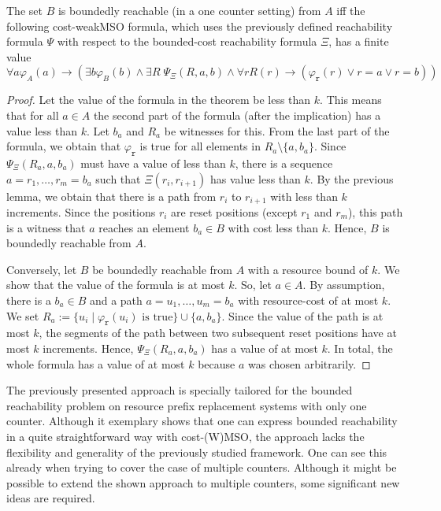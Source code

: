 \documentclass{LMCS}
\newcommand{\rOp}{\ensuremath{\mathtt{r}}}
\begin{document}
\begin{thm}\label{thm:WMSOBoundedReachability}
  The set $B$ is boundedly reachable (in a one counter setting) from $A$ iff the following cost-weakMSO
formula, which uses the previously defined reachability formula $\Psi$ with 
respect to the bounded-cost reachability formula $\Xi$, has a finite value
  $$ \forall a \varphi_A(a) \rightarrow (\exists b \varphi_B(b) \wedge \exists
R\; \Psi_{\Xi}(R,a,b) \wedge \forall r R(r) \rightarrow (\varphi_\rOp(r) \vee r
= a \vee r = b))$$
\end{thm}

\begin{proof}
Let the value of the formula in the theorem be less than $k$. This means that
for all $a \in A$ the second part of the formula (after the implication) has a
value less than $k$. Let $b_a$ and $R_a$ be witnesses for this. From the last
part of the formula, we obtain that $\varphi_\rOp$ is true for all elements in
$R_a \setminus \{a,b_a\}$. Since $\Psi_\Xi(R_a,a,b_a)$ must have a value of less
than $k$, there is a sequence $a = r_1,\ldots,r_m = b_a$ such that
$\Xi(r_i,r_{i+1})$ has value less than $k$. By the previous lemma, we obtain
that there is a path from $r_i$ to $r_{i+1}$ with less than $k$ increments.
Since the positions $r_i$ are reset positions (except $r_1$ and $r_m$), this
path is a witness that $a$ reaches an element $b_a \in B$ with cost less than
$k$. Hence, $B$ is boundedly reachable from $A$.
  
Conversely, let $B$ be boundedly reachable from $A$ with a resource bound of
$k$. We show that the value of the formula is at most $k$. So, let $a \in A$. By
assumption, there is a $b_a \in B$ and a path $a = u_1, \ldots, u_m = b_a$ with
resource-cost of at most $k$. We set $R_a := \{ u_i \mid \varphi_\rOp(u_i)
\text{ is true}\} \cup \{a,b_a\}$. Since the value of the path is at most $k$,
the segments of the path between two subsequent reset positions have at most $k$
increments. Hence, $\Psi_\Xi(R_a,a,b_a)$ has a value of at most $k$. In total,
the whole formula has a value of at most $k$ because $a$ was chosen arbitrarily.
\end{proof}


The previously presented approach is specially tailored for the 
bounded reachability problem on resource prefix replacement systems with 
only one counter. Although it exemplary shows that one can express 
bounded reachability in a quite straightforward way with cost-(W)MSO,
the approach lacks the flexibility and generality of the previously studied
framework. One can see this already when trying to cover the case of
multiple counters. Although it might be possible to extend the shown approach
to multiple counters, some significant new ideas are required.
\end{document}
